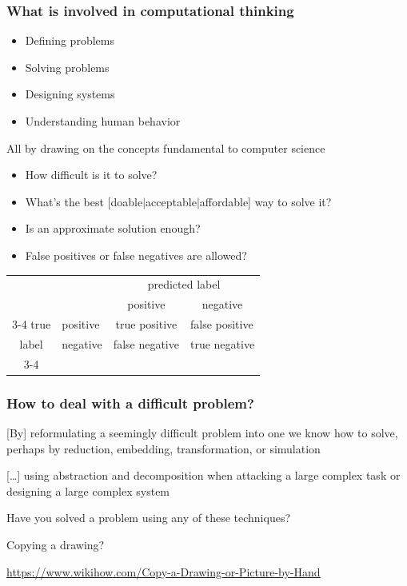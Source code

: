 \documentclass[xcolor=x11names,handout]{beamer}
\newcommand{\light}[1]{\textcolor{gray}{#1}}
\begin{document}
\begin{frame}
\frametitle{What is involved in computational thinking}

\begin{itemize}
 \item Defining problems				\pause
 \item Solving problems					\pause
 \item Designing systems				\pause
 \item Understanding human behavior
\end{itemize}
\bigskip

All by drawing on the concepts fundamental to computer science
\bigskip 									\pause

\begin{itemize}
 \item How difficult is it to solve?			\pause
 \item What’s the best [doable$\mid$acceptable$\mid$affordable] way to solve it?
\pause
 \item Is an approximate solution enough?	\pause
 \item False positives or false negatives are allowed?	\pause
\end{itemize}
\begin{center}
\begin{tabular}{cccc}
                 &              & \multicolumn{2}{c}{\alert{predicted label}}
\\
                 &              &  positive     & negative      \\\cline{3-4}
\alert{true}& \multicolumn{1}{l|}{positive}& true positive      &
\multicolumn{1}{l|}{false positive}\\
\alert{label}& \multicolumn{1}{l|}{negative}& false negative&
\multicolumn{1}{l|}{true negative} \\\cline{3-4}
\end{tabular}
\end{center}
\end{frame}

\begin{frame}
\frametitle{How to deal with a difficult problem?}

[By] reformulating a seemingly difficult problem into one we know how to solve,
perhaps by reduction, embedding, transformation, or simulation	\pause
\medskip

[\ldots] using abstraction and decomposition when attacking a large complex task
or designing a large complex system
\bigskip 		\pause

Have \alert{you} solved a problem using any of these techniques?	\pause
\bigskip					\pause

\alert{Copying a drawing?}

\light{\url{https://www.wikihow.com/Copy-a-Drawing-or-Picture-by-Hand}}
\end{frame}
\end{document}
